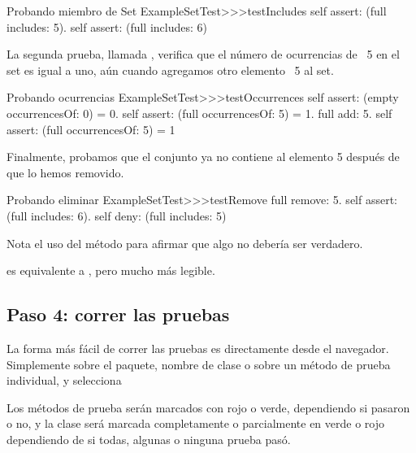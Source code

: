 \documentclass[a4paper,10pt,twoside]{book}
\begin{document}
\begin{method}[testIncludes]{Probando miembro de Set}
ExampleSetTest>>>testIncludes
	self assert: (full includes: 5).
	self assert: (full includes: 6)
\end{method}

La segunda prueba, llamada , verifica que el n\'umero de ocurrencias
de ~5 en el set  es igual a uno, a\'un cuando agregamos otro elemento ~5 al set.

\begin{method}[testOccurrences]{Probando ocurrencias}
ExampleSetTest>>>testOccurrences
	self assert: (empty occurrencesOf: 0) = 0.
	self assert: (full occurrencesOf: 5) = 1.
	full add: 5.
	self assert: (full occurrencesOf: 5) = 1
\end{method}

Finalmente, probamos que el conjunto ya no contiene al elemento 5 despu\'es de que lo hemos removido.

\begin{method}[testRemove]{Probando eliminar}
ExampleSetTest>>>testRemove
	full remove: 5.
	self assert: (full includes: 6).
	self deny: (full includes: 5)
\end{method}

\noindent

Nota el uso del m\'etodo  para afirmar que algo no deber\'ia ser 
 verdadero.

 es equivalente a , pero mucho m\'as legible.
\subsection{Paso 4: correr las pruebas}

La forma m\'as f\'acil de correr las pruebas es directamente desde el navegador.
Simplemente \actclick sobre el paquete, nombre de clase o sobre un m\'etodo de prueba individual, 
y selecciona 

Los m\'etodos de prueba ser\'an marcados con rojo o verde, dependiendo si pasaron o no, y la clase ser\'a marcada completamente o parcialmente en verde o rojo dependiendo de si todas, algunas o ninguna prueba pas\'o.
\end{document}
